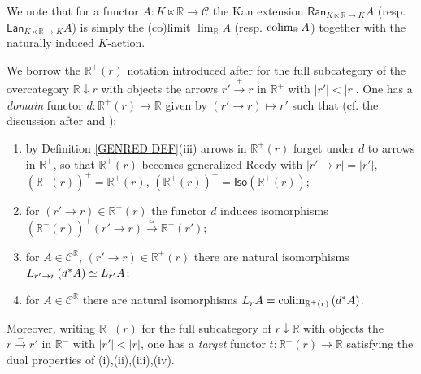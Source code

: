 \documentclass[a4paper,10pt
 ,draft
]{article}%
\begin{document}
\begin{notation}

We note that for a functor
$A\colon K \ltimes \mathbb{R} \to \mathcal{C}$
the Kan extension
$\mathsf{Ran}_{K \ltimes \mathbb{R} \to K} A$
(resp. $\mathsf{Lan}_{K \ltimes \mathbb{R} \to K} A$)
is simply the (co)limit
$\lim_{\mathbb{R}} A$
(resp. $\operatorname{colim}_{\mathbb{R}} A$)
together with the naturally induced $K$-action.
\end{notation}



\begin{notation}\label{RPLUSR NOT}
We borrow the $\mathbb{R}^+(r)$ notation introduced after \cite[Rem. 1.5]{BM11} for the full subcategory of the overcategory $\mathbb{R} \downarrow r$
with objects the arrows 
$r' \xrightarrow{+} r$ in $\mathbb{R}^+$
with $|r'|<|r|$.
One has a \emph{domain} 
functor $d\colon \mathbb{R}^+(r) \to \mathbb{R}$ given by 
$(r'\to r) \mapsto r'$ such that
(cf. the discussion after \cite[Rem. 1.5]{BM11} and 
\cite[Lemma 4.4(i)]{BM11}):
\begin{enumerate}[label=(\roman*)]
\item by Definition \ref{GENRED DEF}(iii)
arrows in $\mathbb{R}^+(r)$ forget under $d$ to arrows in $\mathbb{R}^+$, so that
$\mathbb{R}^+(r)$ becomes generalized Reedy with
$|r' \to r| = |r'|$,
$\left(\mathbb{R}^+(r)\right)^+ = \mathbb{R}^+(r)$,
$\left(\mathbb{R}^+(r)\right)^- = \mathsf{Iso}\left(\mathbb{R}^+(r)\right)$;
\item for $(r' \to r) \in \mathbb{R}^+(r)$ the functor $d$ induces isomorphisms
$\left(\mathbb{R}^+(r)\right)^+(r'\to r) \xrightarrow{\simeq} \mathbb{R}^+(r')$;
\item for $A \in \mathcal{C}^{\mathbb{R}}$, $(r' \to r) \in \mathbb{R}^+(r)$
there are natural isomorphisms 
$L_{r' \to r} \left(d^{\**} A \right) \simeq L_{r'} A$;
\item for $A \in \mathcal{C}^{\mathbb{R}}$ there are natural isomorphisms  $L_r A = \mathop{\colim}_{\mathbb{R}^+(r)} 
\left(d^{\**}A \right)$.
\end{enumerate}
Moreover, writing $\mathbb{R}^-(r)$ for the full subcategory of $r\downarrow \mathbb{R}$ with objects the 
$r \xrightarrow{-} r'$ in $\mathbb{R}^-$ with $|r'|<|r|$, 
one has a \emph{target} functor $t \colon \mathbb{R}^-(r) \to \mathbb{R}$ satisfying the dual properties of (i),(ii),(iii),(iv).
\end{notation}
\end{document}
